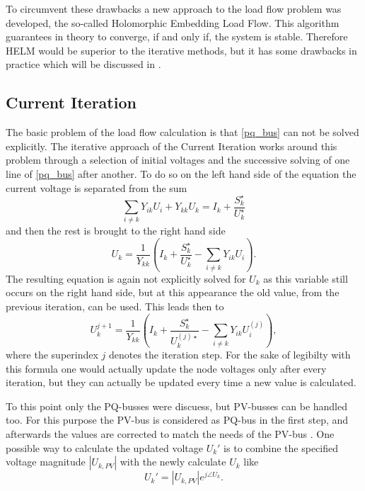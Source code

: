 To circumvent these drawbacks a new approach to the load flow problem was developed, the so-called Holomorphic Embedding Load Flow. This algorithm guarantees in theory to converge, if and only if, the system is stable. Therefore HELM would be superior to the iterative methods, but it has some drawbacks in practice which will be discussed in . 

\subsection{Current Iteration}
\label{sec:current_iteration}
The basic problem of the load flow calculation is that \eqref{pq_bus} can not be solved explicitly. The iterative approach of the Current Iteration works around this problem through a selection of initial voltages and the successive solving of one line of \eqref{pq_bus} after another. To do so on the left hand side of the equation the current voltage is separated from the sum
\begin{equation}
	\sum_{i \ne k} Y_{ik} U_i + Y_{kk} U_k = I_k + \frac{S_k^\star}{U_k^\star}
\end{equation}
and then the rest is brought to the right hand side
\begin{equation}
	 U_k = \frac{1}{Y_{kk}} \left( I_k + \frac{S_k^\star}{U_k^\star} - \sum_{i \ne k} Y_{ik} U_i \right).
\end{equation}
The resulting equation is again not explicitly solved for $U_k$ as this variable still occurs on the right hand side, but at this appearance the old value, from the previous iteration, can be used. This leads then to
\begin{equation}
	 U_k^{j + 1} = \frac{1}{Y_{kk}} \left( I_k + \frac{S_k^\star}{U_k^{(j) \star}} - \sum_{i \ne k} Y_{ik} U_i^{(j)} \right),
\end{equation}
where the superindex $j$ denotes the iteration step. For the sake of legibilty with this formula one would actually update the node voltages only after every iteration, but they can actually be updated every time a new value is calculated.

To this point only the PQ-busses were discuess, but PV-busses can be handled too. For this purpose the PV-bus is considered as PQ-bus in the first step, and afterwards the values are corrected to match the needs of the PV-bus \citep[p. 211]{powerSystemAnalysis}. One possible way to calculate the updated voltage $U_k'$ is to combine the specified voltage magnitude $|U_{k,PV}|$ with the newly calculate $U_k$ like
\begin{equation}
	U_k' = |U_{k,PV}| e^{j \angle U_k}.
\end{equation}

